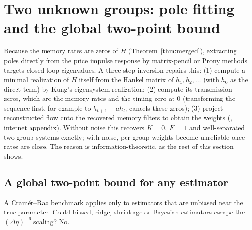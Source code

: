 \documentclass[12pt]{article}
\theoremstyle{definition}
\theoremstyle{remark}
\begin{document}
\section{Two unknown groups: pole fitting and the global two-point bound}\label{app:twocohort}

Because the memory rates are zeros of $H$ (Theorem~\ref{thm:merged}), extracting poles directly from the price impulse response by matrix-pencil or Prony methods targets closed-loop eigenvalues. A three-step inversion repairs this: (1) compute a minimal realization of $H$ itself from the Hankel matrix of $h_1,h_2,\ldots$ (with $h_0$ as the direct term) by Kung's eigensystem realization; (2) compute its transmission zeros, which are the memory rates and the timing zero at $0$ (transforming the sequence first, for example to $h_{t+1}-ah_t$, cancels these zeros); (3) project reconstructed flow onto the recovered memory filters to obtain the weights (\citealp{niroula2026a}, internet appendix). Without noise this recovers $K=0$, $K=1$ and well-separated two-group systems exactly; with noise, per-group weights become unreliable once rates are close. The reason is information-theoretic, as the rest of this section shows.

\subsection{A global two-point bound for any estimator}

A Cram\'er--Rao benchmark \citep{niroula2026a} applies only to estimators that are unbiased near the true parameter. Could biased, ridge, shrinkage or Bayesian estimators escape the $(\Delta\eta)^{-6}$ scaling? No.
\end{document}
